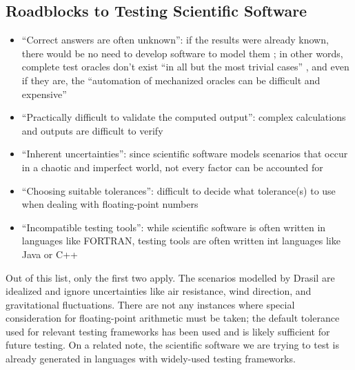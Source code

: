 \subsection[Roadblocks to Testing Scientific Software]
{Roadblocks to Testing Scientific Software
      \citep[p.~67]{KanewalaAndYuehChen2019}}
\label{chap:testing:sec:sci-testing-roadblocks}
\begin{itemize}
      \item ``Correct answers are often unknown'': if the results were already
            known, there would be no need to develop software to model them
            \citep[p.~67]{KanewalaAndYuehChen2019}; in other words, complete
            test oracles don't exist ``in all but the most trivial cases''
            \citep[p.~510]{BarrEtAl2015}, and even if they are, the
            ``automation of mechanized oracles can be difficult and expensive''
            \citep[p.~5.5]{SWEBOK2024}
      \item ``Practically difficult to validate the computed output'': complex
            calculations and outputs are difficult to verify
            \citep[p.~67]{KanewalaAndYuehChen2019}
      \item ``Inherent uncertainties'': since scientific software models
            scenarios that occur in a chaotic and imperfect world, not every
            factor can be accounted for \citep[p.~67]{KanewalaAndYuehChen2019}
      \item ``Choosing suitable tolerances'': difficult to decide what
            tolerance(s) to use when dealing with floating-point numbers
            \citep[p.~67]{KanewalaAndYuehChen2019}
      \item ``Incompatible testing tools'': while scientific software is often
            written in languages like FORTRAN, testing tools are often written
            int languages like Java or C++ \citep[p.~67]{KanewalaAndYuehChen2019}
\end{itemize}

Out of this list, only the first two apply. The scenarios modelled by Drasil
are idealized and ignore uncertainties like air resistance, wind direction,
and gravitational fluctuations. There are not any instances where special
consideration for floating-point arithmetic must be taken; the default
tolerance used for relevant testing frameworks has been used
 and is likely sufficient for future testing. On a related
note, the scientific software we are trying to test is already generated in
languages with widely-used testing frameworks. 
